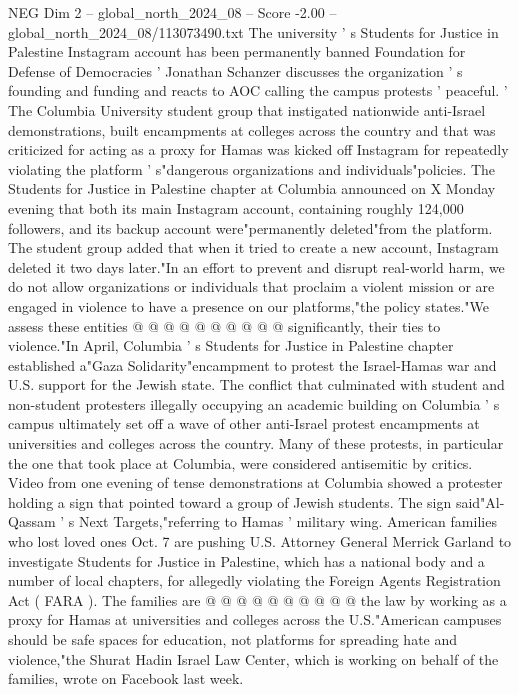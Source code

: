 \begin{textsample}{NEG Dim 2 – global\_north\_2024\_08 – Score -2.00 – global\_north\_2024\_08/113073490.txt}  \label{ex:f2_neg_050}
The university ' s Students for Justice in Palestine Instagram account has been permanently banned Foundation for Defense of Democracies ' Jonathan Schanzer discusses the organization ' s founding and funding and reacts to AOC calling the campus protests ' peaceful. ' The Columbia University student group that instigated nationwide anti-Israel demonstrations, built encampments at colleges across the country and that was criticized for acting as a proxy for Hamas was kicked off Instagram for repeatedly violating the platform ' s"dangerous organizations and individuals"policies.
The Students for Justice in Palestine chapter at Columbia announced on X Monday evening that both its main Instagram account, containing roughly 124,000 followers, and its backup account were"permanently deleted"from the platform.
The student group added that when it tried to create a new account, Instagram deleted it two days later."In an effort to prevent and disrupt real-world harm, we do not allow organizations or individuals that proclaim a violent mission or are engaged in violence to have a presence on our platforms,"the policy states."We assess these entities @ @ @ @ @ @ @ @ @ @ significantly, their ties to violence."In April, Columbia ' s Students for Justice in Palestine chapter established a"Gaza Solidarity"encampment to protest the Israel-Hamas war and U.S. support for the Jewish state.
The conflict that culminated with student and non-student protesters illegally occupying an academic building on Columbia ' s campus ultimately set off a wave of other anti-Israel protest encampments at universities and colleges across the country.
Many of these protests, in particular the one that took place at Columbia, were considered antisemitic by critics.
Video from one evening of tense demonstrations at Columbia showed a protester holding a sign that pointed toward a group of Jewish students.
The sign said"Al-Qassam ' s Next Targets,"referring to Hamas ' military wing.
American families who lost loved ones Oct. 7 are pushing U.S.
Attorney General Merrick Garland to investigate Students for Justice in Palestine, which has a national body and a number of local chapters, for allegedly violating the Foreign Agents Registration Act ( FARA ).
The families are @ @ @ @ @ @ @ @ @ @ the law by working as a proxy for Hamas at universities and colleges across the U.S."American campuses should be safe spaces for education, not platforms for spreading hate and violence,"the Shurat Hadin Israel Law Center, which is working on behalf of the families, wrote on Facebook last week.

\end{textsample}
